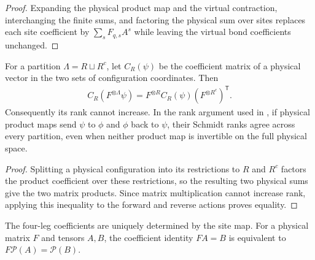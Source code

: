 \begin{proof}\leanok
    Expanding the physical product map and the virtual contraction,
    interchanging the finite sums, and factoring the physical sum over sites
    replaces each site coefficient by $\sum_s F_{q,s}A^s$ while leaving
    the virtual bond coefficients unchanged.
\end{proof}

\begin{lemma}%
    \label{thm:peps_physical_product_cut_rank}
    \leanok
    For a partition $\Lambda=R\sqcup R^c$, let $C_R(\psi)$ be the
    coefficient matrix of a physical vector in the two sets of
    configuration coordinates. Then
    \begin{align}
        C_R(F^{\otimes\Lambda}\psi)
        =F^{\otimes R}C_R(\psi)(F^{\otimes R^c})^{\mathsf T}.
    \end{align}
    Consequently its rank cannot increase. In the rank argument
    used in \cite[Corollary~6.10]{Schuch2010PEPS}, if physical product maps
    send $\psi$ to $\phi$ and $\phi$ back to $\psi$, their Schmidt
    ranks agree across every partition, even when neither product map is
    invertible on the full physical space.
\end{lemma}

\begin{proof}\leanok
    Splitting a physical configuration into its restrictions to $R$ and
    $R^c$ factors the product coefficient over these restrictions,
    so the resulting two physical sums give the two matrix products.
    Since matrix multiplication cannot increase rank, applying this inequality
    to the forward and reverse actions proves equality.
\end{proof}

\begin{lemma}%
    \label{thm:peps_site_coefficients_composition}
    \leanok
    The four-leg coefficients are uniquely determined by the site map.
    For a physical matrix $F$ and tensors $A,B$, the coefficient identity
    $FA=B$ is equivalent to $F\mathcal P(A)=\mathcal P(B)$.
\end{lemma}

